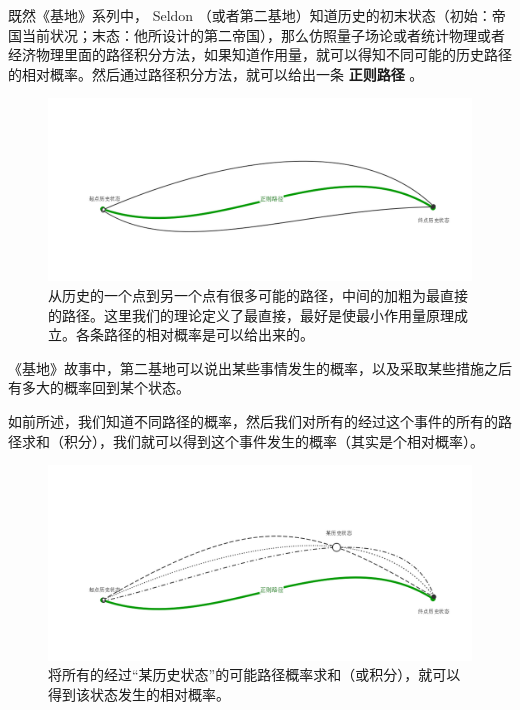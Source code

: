 \documentclass[letterpaper,10pt,english]{sphinxmanual}
\begin{document}
既然《基地》系列中， Seldon （或者第二基地）知道历史的初末状态（初始：帝国当前状况；末态：他所设计的第二帝国），那么仿照量子场论或者统计物理或者经济物理里面的路径积分方法，如果知道作用量，就可以得知不同可能的历史路径的相对概率。然后通过路径积分方法，就可以给出一条 \textbf{正则路径} 。
\begin{figure}[htbp]
\centering
\capstart

\includegraphics{psychohistory-canonical.png}
\caption{从历史的一个点到另一个点有很多可能的路径，中间的加粗为最直接的路径。这里我们的理论定义了最直接，最好是使最小作用量原理成立。各条路径的相对概率是可以给出来的。}\end{figure}

《基地》故事中，第二基地可以说出某些事情发生的概率，以及采取某些措施之后有多大的概率回到某个状态。

如前所述，我们知道不同路径的概率，然后我们对所有的经过这个事件的所有的路径求和（积分），我们就可以得到这个事件发生的概率（其实是个相对概率）。
\begin{figure}[htbp]
\centering
\capstart

\includegraphics{psychohistory-prob.png}
\caption{将所有的经过“某历史状态”的可能路径概率求和（或积分），就可以得到该状态发生的相对概率。}\end{figure}
\end{document}
